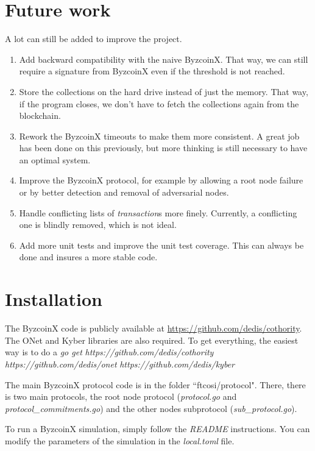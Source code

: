 \documentclass[11pt, a4paper, twoside, openright]{article}
\begin{document}
\section{Future work}
\label{future_works}
A lot can still be added to improve the project.
\begin{enumerate}
\item Add backward compatibility with the naive ByzcoinX. That way, we can still require a signature from ByzcoinX even if the threshold is not reached.
\item Store the collections on the hard drive instead of just the memory. That way, if the program closes, we don't have to fetch the collections again from the blockchain.
\item Rework the ByzcoinX timeouts to make them more consistent. A great job has been done on this previously, but more thinking is still necessary to have an optimal system.
\item Improve the ByzcoinX protocol, for example by allowing a root node failure or by better detection and removal of adversarial nodes.
\item Handle conflicting lists of \textit{transaction}s more finely. Currently, a conflicting one is blindly removed, which is not ideal.
\item Add more unit tests and improve the unit test coverage. This can always be done and insures a more stable code.
\end{enumerate}

\section{Installation}
The ByzcoinX code is publicly available at \url{https://github.com/dedis/cothority}. The ONet and Kyber libraries are also required. To get everything, the easiest way is to do a \textit{go get} \textit{https://github.com/dedis/cothority}\\ \textit{https://github.com/dedis/onet} \textit{https://github.com/dedis/kyber}

The main ByzcoinX protocol code is in the folder ``ftcosi/protocol". There, there is two main protocols, the root node protocol (\textit{protocol.go} and \textit{protocol\_commitments.go}) and the other nodes subprotocol (\textit{sub\_protocol.go}).
 
To run a ByzcoinX simulation, simply follow the \textit{README} instructions. You can modify the parameters of the simulation in the \textit{local.toml} file.
\end{document}
